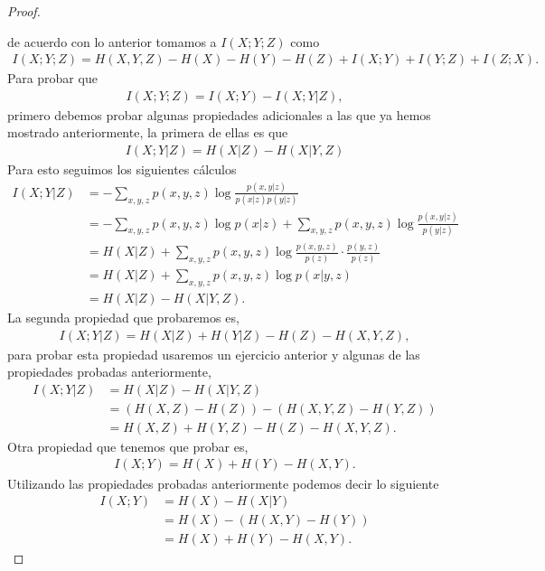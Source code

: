 \begin{enumerate}
\begin{proof}
\begin{center}
\begin{tikzpicture}[x=0.75pt,y=0.75pt,yscale=-1,xscale=1]
\end{tikzpicture}
        \end{center}
de acuerdo con lo anterior tomamos a $I(X;Y;Z)$ como
\begin{align*}
    I(X;Y;Z)=H(X,Y,Z)-H(X)-H(Y)-H(Z)+I(X;Y)+I(Y;Z)+I(Z;X).
\end{align*}
Para probar que
\begin{align*}
    I(X;Y;Z) = I(X;Y)-I(X;Y|Z),
\end{align*} 
primero debemos probar algunas propiedades adicionales a las que ya hemos mostrado anteriormente,
la primera de ellas es que 
\begin{align}
    I(X; Y |Z) = H(X|Z)-H(X|Y,Z)
\end{align}
Para esto seguimos los siguientes cálculos
\begin{align*}
I(X; Y | Z) &= - \sum_{x,y,z} p(x, y, z) \log \frac{p(x, y | z)}{p(x | z) p(y | z)} \\
&= - \sum_{x,y,z} p(x, y, z) \log p(x | z) + \sum_{x,y,z} p(x, y, z) \log \frac{p(x, y | z)}{p(y |z)} \\
&= H(X|Z) + \sum_{x,y,z} p(x, y, z) \log \frac{p(x, y, z)}{p(z)} \cdot \frac{ p(y, z)}{p(z)} \\
&= H(X|Z) + \sum_{x,y,z} p(x, y, z) \log p(x | y, z) \\
&= H(X|Z) - H(X|Y, Z).
\end{align*}
La segunda propiedad que probaremos es,
\begin{align}
    I(X; Y |Z) = H(X|Z) + H(Y |Z) - H(Z) -H(X, Y,Z),
\end{align}
 para probar esta propiedad usaremos un ejercicio anterior y algunas de las propiedades probadas anteriormente,
 \begin{align*}
I(X; Y | Z) &= H(X | Z) - H(X | Y, Z)  \\
&= (H(X, Z) - H(Z)) - (H(X, Y, Z) - H(Y, Z)) \\
&= H(X, Z) + H(Y, Z) - H(Z) - H(X, Y, Z).
\end{align*}
Otra propiedad que tenemos que probar es,
\begin{align}
    I(X; Y ) = H(X) + H(Y ) -H(X, Y ).
\end{align}
Utilizando las propiedades probadas anteriormente podemos decir lo siguiente
\begin{align*}
I(X; Y) &= H(X) - H(X | Y) \\
&= H(X) - (H(X, Y) - H(Y))   \\
&= H(X) + H(Y) - H(X, Y).
\end{align*}


\end{proof}
\end{enumerate}
